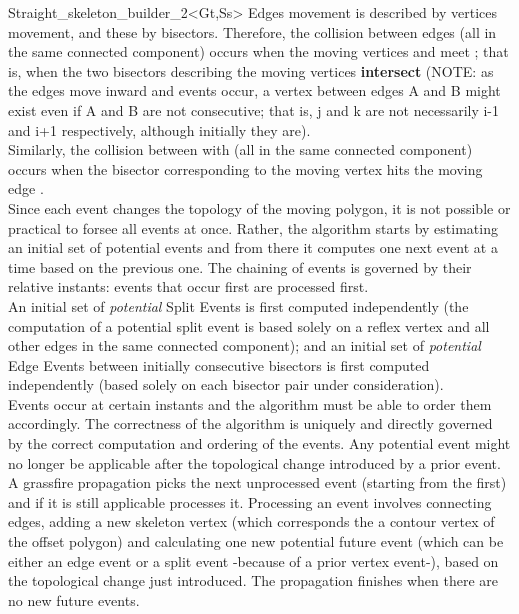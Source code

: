 \begin{ccRefClass}{Straight_skeleton_builder_2<Gt,Ss>}
Edges movement is described by vertices movement, and these by bisectors. Therefore, the collision between edges  (all in the same connected component) occurs when the moving vertices  and  meet ; that is, when the two bisectors describing the moving vertices 
\textbf{intersect} (NOTE: as the edges move inward and events occur, a vertex between edges A and B might exist even if A and B are not consecutive; that is, j and k are not necessarily i-1 and i+1 respectively, although initially they are).\\
Similarly, the collision between  with  (all in the same connected component) occurs when the bisector corresponding to the moving vertex  hits the moving edge .\\
Since each event changes the topology of the moving polygon, it is not possible or practical to forsee all events at once. Rather, the algorithm starts by estimating an initial set of potential events and from there it computes one next event at a time based on the previous one. The chaining of events is governed by their relative instants: events that occur first are processed first.\\
An initial set of \textit{potential} Split Events is first computed independently (the computation of a potential split event is based solely on a reflex vertex and all other edges in the same connected component); and an initial set of \textit{potential} Edge Events between initially consecutive bisectors is first computed independently (based solely on each bisector pair under consideration).\\
Events occur at certain instants and the algorithm must be able to order them
accordingly. The correctness of the algorithm is uniquely and directly governed by the correct computation and ordering of the events. Any potential event might no longer be applicable after the topological change introduced by a prior event.\\
A grassfire propagation picks the next unprocessed event (starting from the first) and if it is still applicable processes it. Processing an event involves connecting edges, adding a new skeleton vertex (which corresponds the a contour vertex of the offset polygon) and calculating one new potential future event (which can be either an edge event or a split event -because of a prior vertex event-), based on the topological change just introduced. The propagation finishes when there are no new future events.


\end{ccRefClass}
